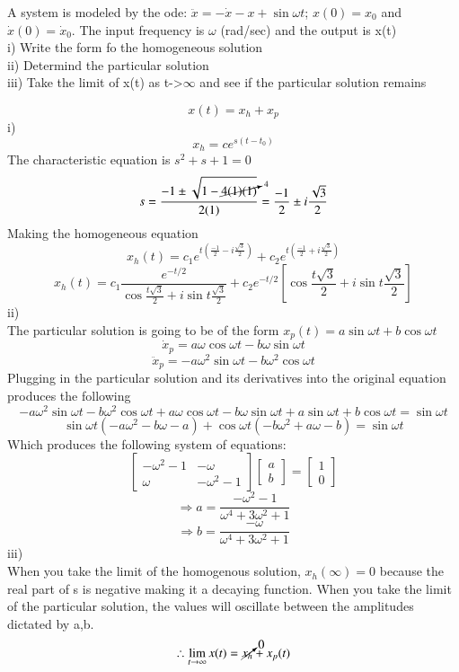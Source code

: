 \documentclass[12pt]{exam}
\begin{document}
\begin{questions}
\newpage 
\begin{question}
A system is modeled by the ode: \(\ddot{x} = -\dot{x} - x + \sin \omega t\); \(x(0) = x_0\) and \(\dot{x}(0) = \dot{x}_0\). The input
frequency is \(\omega\) (rad/sec) and the output is x(t) \\
i) Write the form fo the homogeneous solution \\
ii) Determind the particular solution \\
iii) Take the limit of x(t) as t->\(\infty\) and see if the particular solution remains \\
\end{question}
\begin{solutionorbox}[\stretch{1}]
\[x(t) = x_h + x_p\]
i)
\[x_h = c e^{s(t-t_0)}\]
The characteristic equation is \(s^2 + s + 1 = 0\)
\[s = \frac{-1 \pm \sqrt{1-\cancelto{4}{4(1)(1)}}}{2(1)} = \frac{-1}{2} \pm i\frac{\sqrt{3}}{2}\]
Making the homogeneous equation \[x_h(t) = c_1 e^{t(\frac{-1}{2} - i\frac{\sqrt{3}}{2})} + c_2 e^{t(\frac{-1}{2} + i\frac{\sqrt{3}}{2})}\]
\[x_h(t) = c_1 \frac{e^{-t/2}}{\cos{\frac{t\sqrt{3}}{2}} + i \sin{t\frac{\sqrt{3}}{2}}} + c_2 e^{-t/2} \left[\cos{\frac{t\sqrt{3}}{2}}+  i \sin{t\frac{\sqrt{3}}{2}}\right]\]
ii)\\
The particular solution is going to be of the form \(x_p(t) = a \sin{\omega t} + b \cos{\omega t}\)
\[\dot{x}_p = a \omega \cos{\omega t} - b \omega \sin{\omega t}\]
\[\ddot{x}_p = -a \omega^2 \sin{\omega t} -b \omega^2 \cos{\omega t}\]
Plugging in the particular solution and its derivatives into the original equation produces the following
\[-a \omega^2 \sin{\omega t} -b \omega^2 \cos{\omega t} +
a \omega \cos{\omega t} - b \omega \sin{\omega t} +
a \sin{\omega t} + b \cos{\omega t} = \sin{\omega t} \]
\[\sin{\omega t} (-a\omega^2 - b\omega - a) + \cos{\omega t} (-b\omega^2 +a\omega -b) = \sin{\omega t}\]
Which produces the following system of equations:
\[
\begin{bmatrix}
-\omega^2-1 & -\omega\\
\omega & -\omega^2-1  
\end{bmatrix}
\begin{bmatrix}
a\\b 
\end{bmatrix}
= \begin{bmatrix}
1\\0 
\end{bmatrix}
\]
\[\Rightarrow a = \frac{-\omega^2 - 1}{\omega^4 + 3\omega^2 + 1}\]
\[\Rightarrow b = \frac{-\omega}{\omega^4 + 3\omega^2 + 1}\]
iii) \\
When you take the limit of the homogenous solution, \(x_h(\infty) = 0\) because the real part of s is negative making it a decaying function.
When you take the limit of the particular solution, the values will oscillate between the amplitudes dictated by a,b.
\[\therefore \lim_{t\rightarrow\infty} x(t) = \cancelto{0}{x_h} + x_p(t)\] 
\end{solutionorbox}



\end{questions}
\end{document}
